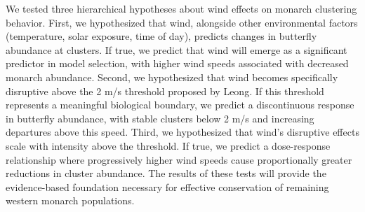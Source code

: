 We tested three hierarchical hypotheses about wind effects on monarch clustering behavior. First, we hypothesized that wind, alongside other environmental factors (temperature, solar exposure, time of day), predicts changes in butterfly abundance at clusters. If true, we predict that wind will emerge as a significant predictor in model selection, with higher wind speeds associated with decreased monarch abundance. Second, we hypothesized that wind becomes specifically disruptive above the 2 m/s threshold proposed by Leong. If this threshold represents a meaningful biological boundary, we predict a discontinuous response in butterfly abundance, with stable clusters below 2 m/s and increasing departures above this speed. Third, we hypothesized that wind's disruptive effects scale with intensity above the threshold. If true, we predict a dose-response relationship where progressively higher wind speeds cause proportionally greater reductions in cluster abundance. The results of these tests will provide the evidence-based foundation necessary for effective conservation of remaining western monarch populations.